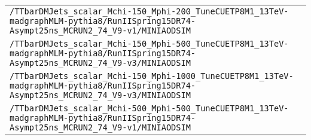 \begin{center}
\begin{tabular}{l}
\verb!/TTbarDMJets_scalar_Mchi-150_Mphi-200_TuneCUETP8M1_13TeV-madgraphMLM-pythia8/RunIISpring15DR74-Asympt25ns_MCRUN2_74_V9-v1/MINIAODSIM! \tabularnewline
\verb!/TTbarDMJets_scalar_Mchi-150_Mphi-500_TuneCUETP8M1_13TeV-madgraphMLM-pythia8/RunIISpring15DR74-Asympt25ns_MCRUN2_74_V9-v3/MINIAODSIM! \tabularnewline
\verb!/TTbarDMJets_scalar_Mchi-150_Mphi-1000_TuneCUETP8M1_13TeV-madgraphMLM-pythia8/RunIISpring15DR74-Asympt25ns_MCRUN2_74_V9-v3/MINIAODSIM! \tabularnewline
\verb!/TTbarDMJets_scalar_Mchi-500_Mphi-500_TuneCUETP8M1_13TeV-madgraphMLM-pythia8/RunIISpring15DR74-Asympt25ns_MCRUN2_74_V9-v1/MINIAODSIM! \tabularnewline
\hline
\end{tabular}\end{center}
